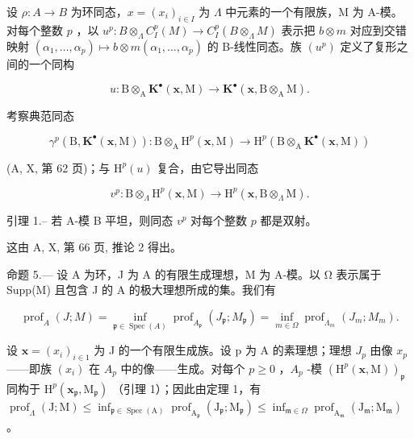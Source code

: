 设 \(\rho: A \to B\) 为环同态，\(x = (x_i)_{i \in I}\) 为 \(\Lambda\) 中元素的一个有限族，M 为 A-模。对每个整数 \(p\) ，以 \(u^p: B \otimes_\Lambda C_I^p(M) \longrightarrow C_I^p(B \otimes_\Lambda M)\) 表示把 \(b \otimes m\) 对应到交错映射 \((\alpha_1, \ldots, \alpha_p) \mapsto b \otimes m(\alpha_1, \ldots, \alpha_p)\) 的 B-线性同态。族 \((u^p)\) 定义了复形之间的一个同构

\[
u: \mathrm{B} \otimes_ {\mathrm{A}} \mathbf {K} ^ {\bullet} (\mathbf {x}, \mathrm{M}) \longrightarrow \mathbf {K} ^ {\bullet} (\mathbf {x}, \mathrm{B} \otimes_ {\mathrm{A}} \mathrm{M}).
\]

考察典范同态

\[
\gamma^ {p} (\mathrm{B}, \mathbf {K} ^ {\bullet} (\mathbf {x}, \mathrm{M})): \mathrm{B} \otimes_ {\mathrm{A}} \mathrm{H} ^ {p} (\mathbf {x}, \mathrm{M}) \longrightarrow \mathrm{H} ^ {p} (\mathrm{B} \otimes_ {\mathrm{A}} \mathbf {K} ^ {\bullet} (\mathbf {x}, \mathrm{M}))
\]

(A, X, 第 62 页)；与 \(\mathrm{H}^{p}(u)\) 复合，由它导出同态

\[
v ^ {p}: \mathrm{B} \otimes_ {\Lambda} \mathrm{H} ^ {p} (\mathbf {x}, \mathrm{M}) \longrightarrow \mathrm{H} ^ {p} (\mathbf {x}, \mathrm{B} \otimes_ {\Lambda} \mathrm{M}).
\]

引理 1.-- 若 A-模 B 平坦，则同态 \(v^p\) 对每个整数 \(p\) 都是双射。

这由 A, X, 第 66 页, 推论 2 得出。

命题 5.--- 设 A 为环，J 为 A 的有限生成理想，M 为 A-模。以 Ω 表示属于 Supp(M) 且包含 J 的 A 的极大理想所成的集。我们有

\[
\operatorname{prof} _ {A} (J; M) = \inf _ {\mathfrak {p} \in \operatorname{Spec} (A)} \operatorname{prof} _ {A _ {\mathfrak {p}}} \left(J _ {\mathfrak {p}}; M _ {\mathfrak {p}}\right) = \inf _ {m \in \Omega} \operatorname{prof} _ {\Lambda_ {m}} \left(J _ {m}; M _ {m}\right).
\]

设 \(\mathbf{x} = (x_{i})_{i \in 1}\) 为 J 的一个有限生成族。设 p 为 A 的素理想；理想 \(J_{p}\) 由像 \(x_{p}\) ——即族 \((x_{i})\) 在 \(A_{p}\) 中的像——生成。对每个 \(p \geqslant 0\) ，\(A_{p}\) -模 \(\left(\mathrm{H}^{p}(\mathbf{x},\mathrm{M})\right)_{\mathfrak{p}}\) 同构于 \(\mathrm{H}^{p}(\mathbf{x}_{\mathfrak{p}},\mathrm{M}_{\mathfrak{p}})\) （引理 1）；因此由定理 1，有 \(\operatorname{prof}_{\Lambda}(\mathrm{J};\mathrm{M}) \leqslant \inf_{\mathfrak{p} \in \operatorname{Spec}(\mathrm{A})} \operatorname{prof}_{\mathrm{A}_{\mathfrak{p}}}(\mathrm{J}_{\mathfrak{p}}; \mathrm{M}_{\mathfrak{p}}) \leqslant \inf_{\mathfrak{m} \in \Omega} \operatorname{prof}_{\mathrm{A}_{\mathfrak{m}}}(\mathrm{J}_{\mathfrak{m}}; \mathrm{M}_{\mathfrak{m}})\) 。

